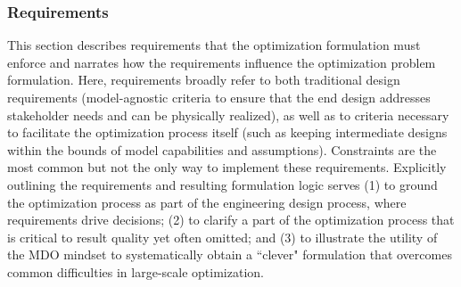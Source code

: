 
\subsubsection{Requirements}\label{sec:requirements}
This section describes requirements that the optimization formulation must enforce and narrates how the requirements influence the optimization problem formulation. Here, requirements broadly refer to both traditional design requirements (model-agnostic criteria to ensure that the end design addresses stakeholder needs and can be physically realized), as well as to criteria necessary to facilitate the optimization process itself (such as keeping intermediate designs within the bounds of model capabilities and assumptions). Constraints are the most common but not the only way to implement these requirements. Explicitly outlining the requirements and resulting formulation logic serves (1) to ground the optimization process as part of the engineering design process, where requirements drive decisions; 
(2) to clarify a part of the optimization process that is critical to result quality yet often omitted; and (3) to illustrate the utility of the MDO mindset to systematically obtain a ``clever" formulation that overcomes common difficulties in large-scale optimization. 

